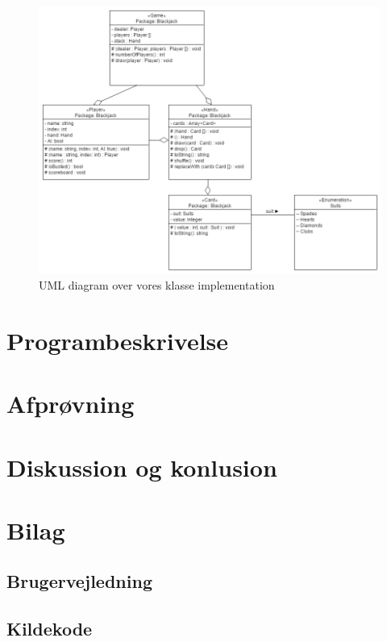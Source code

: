 \documentclass[a4paper]{article}
\begin{document}
      \begin{figure}[H]
        \centering

        \includegraphics[width=520px]{figures/uml.png}

        \caption{UML diagram over vores klasse implementation}
        \label{fig:umlDiagram}
      \end{figure}

  \section{Programbeskrivelse}

  \section{Afprøvning} \label{sec:unitTest}

	\section{Diskussion og konlusion}
  
    \newpage
    \section{Bilag}
    
    \subsection{Brugervejledning}

    \subsection{Kildekode}
      
      
      
\end{document}

